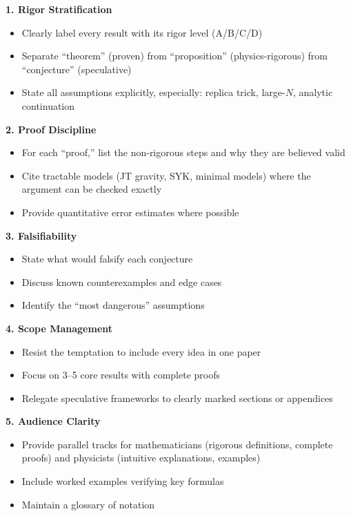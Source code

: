 \documentclass[12pt,a4paper]{article}
\begin{document}
\begin{tcolorbox}[colback=gray!5!white, colframe=gray!75!black, title=\textbf{Best Practices for Rigorous Holography}]

\textbf{1. Rigor Stratification}
\begin{itemize}
    \item Clearly label every result with its rigor level (A/B/C/D)
    \item Separate ``theorem'' (proven) from ``proposition'' (physics-rigorous) from ``conjecture'' (speculative)
    \item State all assumptions explicitly, especially: replica trick, large-$N$, analytic continuation
\end{itemize}

\textbf{2. Proof Discipline}
\begin{itemize}
    \item For each ``proof,'' list the non-rigorous steps and why they are believed valid
    \item Cite tractable models (JT gravity, SYK, minimal models) where the argument can be checked exactly
    \item Provide quantitative error estimates where possible
\end{itemize}

\textbf{3. Falsifiability}
\begin{itemize}
    \item State what would falsify each conjecture
    \item Discuss known counterexamples and edge cases
    \item Identify the ``most dangerous'' assumptions
\end{itemize}

\textbf{4. Scope Management}
\begin{itemize}
    \item Resist the temptation to include every idea in one paper
    \item Focus on 3--5 core results with complete proofs
    \item Relegate speculative frameworks to clearly marked sections or appendices
\end{itemize}

\textbf{5. Audience Clarity}
\begin{itemize}
    \item Provide parallel tracks for mathematicians (rigorous definitions, complete proofs) and physicists (intuitive explanations, examples)
    \item Include worked examples verifying key formulas
    \item Maintain a glossary of notation
\end{itemize}

\end{tcolorbox}
\end{document}
